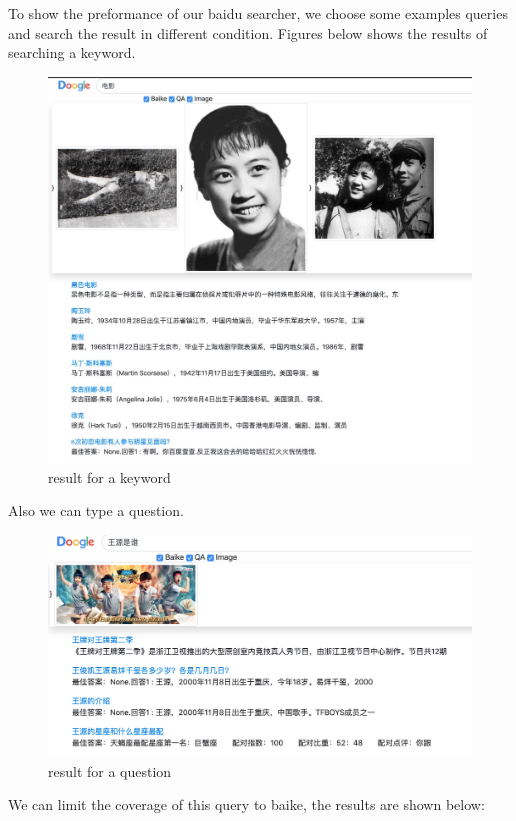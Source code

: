 \documentclass[10pt,times,twocolumn]{article}
\begin{document}
To show the preformance of our baidu searcher, we choose some examples queries and search the result in different condition. 
\newline
Figures below shows the results of searching a keyword.
\begin{figure}[ht]
\centering
\includegraphics[scale=0.17]{fig/6}
\caption{result for a keyword}
\label{fig:label}
\end{figure}
\newline
Also we can type a question.
\begin{figure}[ht]
\centering
\includegraphics[scale=0.13]{fig/7}
\caption{result for a question}
\label{fig:label}
\end{figure}
\newline
We can limit the coverage of this query to baike, the results are shown below:
\end{document}
